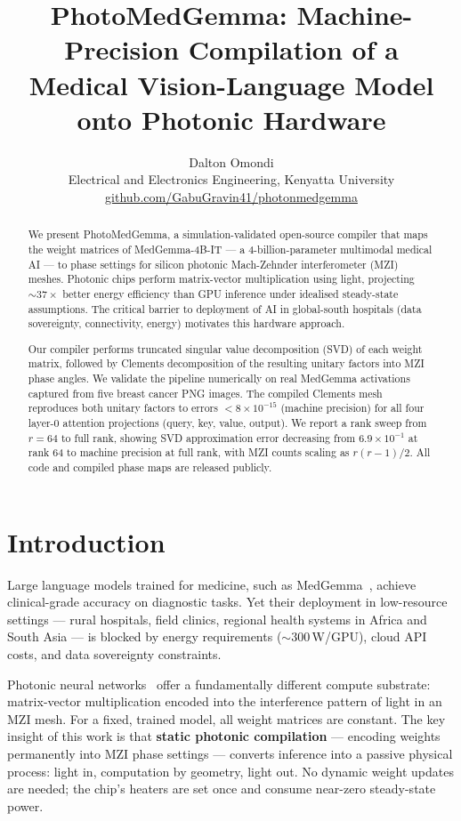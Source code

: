 \documentclass{article}
\title{PhotoMedGemma: Machine-Precision Compilation of a\\
       Medical Vision-Language Model onto Photonic Hardware}
\author{%
    Dalton Omondi\\[2pt]
  \small Electrical and Electronics Engineering, Kenyatta University\\[2pt]
  \small \href{https://github.com/GabuGravin41/photonmedgemma}{github.com/GabuGravin41/photonmedgemma}
}
\begin{document}
\maketitle

\begin{abstract}
We present PhotoMedGemma, a simulation-validated open-source compiler that
maps the weight matrices of MedGemma-4B-IT --- a 4-billion-parameter multimodal
medical AI --- to phase settings for silicon photonic Mach-Zehnder
interferometer (MZI) meshes.
Photonic chips perform matrix-vector multiplication using light, projecting
$\sim 37\times$ better energy efficiency than GPU inference under idealised
steady-state assumptions.
The critical barrier to deployment of AI in global-south hospitals
(data sovereignty, connectivity, energy) motivates this hardware approach.

Our compiler performs truncated singular value decomposition (SVD) of each
weight matrix, followed by Clements decomposition of the resulting unitary
factors into MZI phase angles.
We validate the pipeline numerically on real MedGemma activations captured
from five breast cancer PNG images.
The compiled Clements mesh reproduces both unitary factors to errors
$< 8 \times 10^{-15}$ (machine precision) for all four layer-0 attention
projections (query, key, value, output).
We report a rank sweep from $r = 64$ to full rank, showing
SVD approximation error decreasing from $6.9 \times 10^{-1}$ at rank 64
to machine precision at full rank, with MZI counts scaling as $r(r-1)/2$.
All code and compiled phase maps are released publicly.
\end{abstract}

\section{Introduction}

Large language models trained for medicine, such as MedGemma~\citep{medgemma2024},
achieve clinical-grade accuracy on diagnostic tasks.
Yet their deployment in low-resource settings --- rural hospitals, field
clinics, regional health systems in Africa and South Asia --- is blocked by
energy requirements ($\sim 300$\,W/GPU), cloud API costs, and data sovereignty
constraints.

Photonic neural networks~\citep{shen2017, bandyopadhyay2022} offer a
fundamentally different compute substrate: matrix-vector multiplication encoded
into the interference pattern of light in an MZI mesh.
For a fixed, trained model, all weight matrices are constant.
The key insight of this work is that \textbf{static photonic compilation} ---
encoding weights permanently into MZI phase settings --- converts inference
into a passive physical process: light in, computation by geometry,
light out.
No dynamic weight updates are needed; the chip's heaters are set once and
consume near-zero steady-state power.
\end{document}
